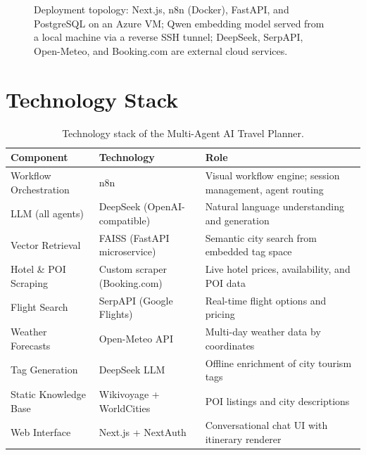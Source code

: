 \documentclass[12pt,a4paper]{report}
\begin{document}
\begin{figure}[H]
{
}%
\caption{Deployment topology: Next.js, n8n (Docker), FastAPI, and PostgreSQL on an Azure VM;
         Qwen embedding model served from a local machine via a reverse SSH tunnel; DeepSeek,
         SerpAPI, Open-Meteo, and Booking.com are external cloud services.}
\label{fig:deployment}
\end{figure}

\section{Technology Stack}

\begin{table}[H]
\centering
\small
\renewcommand{\arraystretch}{1.3}
\begin{tabularx}{\textwidth}{
    >{\raggedright\arraybackslash}p{3.5cm}
    >{\raggedright\arraybackslash}p{3cm}
    >{\raggedright\arraybackslash}X}
\toprule
\textbf{Component} & \textbf{Technology} & \textbf{Role} \\
\midrule
Workflow Orchestration & n8n & Visual workflow engine; session management, agent routing \\
LLM (all agents)       & DeepSeek (OpenAI-compatible) & Natural language understanding and generation \\
Vector Retrieval       & FAISS (FastAPI microservice) & Semantic city search from embedded tag space \\
Hotel \& POI Scraping  & Custom scraper (Booking.com) & Live hotel prices, availability, and POI data \\
Flight Search          & SerpAPI (Google Flights) & Real-time flight options and pricing \\
Weather Forecasts      & Open-Meteo API & Multi-day weather data by coordinates \\
Tag Generation         & DeepSeek LLM & Offline enrichment of city tourism tags \\
Static Knowledge Base  & Wikivoyage + WorldCities & POI listings and city descriptions \\
Web Interface          & Next.js + NextAuth & Conversational chat UI with itinerary renderer \\
\bottomrule
\end{tabularx}
\caption{Technology stack of the Multi-Agent AI Travel Planner.}
\label{tab:techstack}
\end{table}
\end{document}
